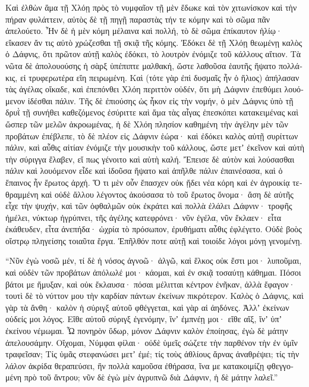 \documentclass{book}
\begin{document}
\begin{pairs}
\begin{Leftside}
\begin{greek}
  Καὶ ἐλθὼν ἅμα τῇ Χλόῃ πρὸς τὸ νυμφαῖον τῇ μὲν ἔδωκε καὶ τὸν χιτωνίσκον καὶ τὴν πήραν φυλάττειν, αὐτὸς δὲ τῇ πηγῇ παραστὰς τήν τε κόμην καὶ τὸ σῶμα πᾶν ἀπελούετο.  Ἦν δὲ ἡ μὲν κόμη μέλαινα καὶ πολλή, τὸ δὲ σῶμα ἐπίκαυτον ἡλίῳ· εἴκασεν ἄν τις αὐτὸ χρώζεσθαι τῇ σκιᾷ τῆς κόμης. Ἐδόκει δὲ τῇ Χλόῃ θεωμένῃ καλὸς ὁ Δάφνις, ὅτι πρῶτον αὐτῇ καλὸς ἐδόκει, τὸ λουτρὸν ἐνόμιζε τοῦ κάλλους αἴτιον. Τὰ νῶτα δὲ ἀπολουούσης ἡ σὰρξ ὑπέπιπτε μαλθακή, ὥστε λαθοῦσα ἑαυτῆς ἥψατο πολλάκις, εἰ τρυφερωτέρα εἴη πειρωμένη.  Καὶ (τότε γὰρ ἐπὶ δυσμαῖς ἦν ὁ ἥλιος) ἀπήλασαν τὰς ἀγέλας οἴκαδε, καὶ ἐπεπόνθει Χλόη περιττὸν οὐδέν, ὅτι μὴ Δάφνιν ἐπεθύμει λουόμενον ἰδέσθαι πάλιν.  Τῆς δὲ ἐπιούσης ὡς ἧκον εἰς τὴν νομήν, ὁ μὲν Δάφνις ὑπὸ τῇ δρυῒ τῇ συνήθει καθεζόμενος ἐσύριττε καὶ ἅμα τὰς αἶγας ἐπεσκόπει κατακειμένας καὶ ὥσπερ τῶν μελῶν ἀκροωμένας, ἡ δὲ Χλόη πλησίον καθημένη τὴν ἀγέλην μὲν τῶν προβάτων ἐπέβλεπε, τὸ δὲ πλέον εἰς Δάφνιν ἑώρα· καὶ ἐδόκει καλὸς αὐτῇ συρίττων πάλιν, καὶ αὖθις αἰτίαν ἐνόμιζε τὴν μουσικὴν τοῦ κάλλους, ὥστε μετʼ ἐκεῖνον καὶ αὐτὴ τὴν σύριγγα ἔλαβεν, εἴ πως γένοιτο καὶ αὐτὴ καλή.  Ἔπεισε δὲ αὐτὸν καὶ λούσασθαι πάλιν καὶ λουόμενον εἶδε καὶ ἰδοῦσα ἥψατο καὶ ἀπῆλθε πάλιν ἐπαινέσασα, καὶ ὁ ἔπαινος ἦν ἔρωτος ἀρχή. Ὅ τι μὲν οὖν ἔπασχεν οὐκ ᾔδει νέα κόρη καὶ ἐν ἀγροικίᾳ τεθραμμένη καὶ οὐδὲ ἄλλου λέγοντος ἀκούσασα τὸ τοῦ ἔρωτος ὄνομα· ἄση δὲ αὐτῆς εἶχε τὴν ψυχήν,  καὶ τῶν ὀφθαλμῶν οὐκ ἐκράτει καὶ πολλὰ ἐλάλει Δάφνιν· τροφῆς ἠμέλει, νύκτωρ ἠγρύπνει, τῆς ἀγέλης κατεφρόνει· νῦν ἐγέλα, νῦν ἔκλαεν· εἶτα ἐκάθευδεν, εἶτα ἀνεπήδα· ὠχρία τὸ πρόσωπον, ἐρυθήματι αὖθις ἐφλέγετο. Οὐδὲ βοὸς οἴστρῳ πληγείσης τοιαῦτα ἔργα. Ἐπῆλθόν ποτε αὐτῇ καὶ τοιοίδε λόγοι μόνῃ γενομένῃ.
\pend


  “Νῦν ἐγὼ νοσῶ μέν, τί δὲ ἡ νόσος ἀγνοῶ· ἀλγῶ, καὶ ἕλκος οὐκ ἔστι μοι· λυποῦμαι, καὶ οὐδὲν τῶν προβάτων ἀπόλωλέ μοι· κάομαι, καὶ ἐν σκιᾷ τοσαύτῃ κάθημαι.  Πόσοι βάτοι με ἤμυξαν, καὶ οὐκ ἔκλαυσα· πόσαι μέλιτται κέντρον ἐνῆκαν, ἀλλὰ ἔφαγον· τουτὶ δὲ τὸ νύττον μου τὴν καρδίαν πάντων ἐκείνων πικρότερον. Καλὸς ὁ Δάφνις, καὶ γὰρ τὰ ἄνθη· καλὸν ἡ σύριγξ αὐτοῦ φθέγγεται, καὶ γὰρ αἱ ἀηδόνες. Ἀλλʼ ἐκείνων οὐδείς μοι λόγος. Εἴθε αὐτοῦ σύριγξ ἐγενόμην, ἵνʼ ἐμπνέῃ μοι·  εἴθε αἴξ, ἵνʼ ὑπʼ ἐκείνου νέμωμαι. Ὦ πονηρὸν ὕδωρ, μόνον Δάφνιν καλὸν ἐποίησας, ἐγὼ δὲ μάτην ἀπελουσάμην. Οἴχομαι, Νύμφαι φίλαι· οὐδὲ ὑμεῖς σώζετε τὴν παρθένον τὴν ἐν ὑμῖν τραφεῖσαν; Τίς ὑμᾶς στεφανώσει μετʼ ἐμέ;  τίς τοὺς ἀθλίους ἄρνας ἀναθρέψει; τίς τὴν λάλον ἀκρίδα θεραπεύσει, ἣν πολλὰ καμοῦσα ἐθήρασα, ἵνα με κατακοιμίζῃ φθεγγομένη πρὸ τοῦ ἄντρου; νῦν δὲ ἐγὼ μὲν ἀγρυπνῶ διὰ Δάφνιν, ἡ δὲ μάτην λαλεῖ.”
\pend



\end{greek}
\end{Leftside}
\end{pairs}
\end{document}
